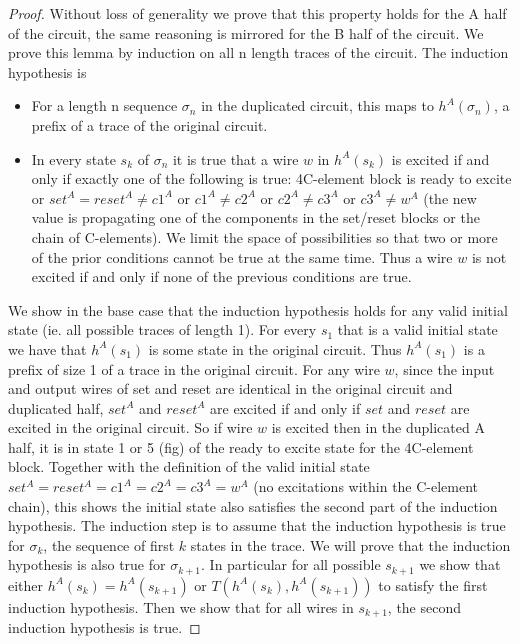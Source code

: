 \documentclass{article}
\begin{document}
\begin{proof}
Without loss of generality we prove that this property holds for the A half of the circuit, the same reasoning is mirrored for the B half of the circuit.  We prove this lemma by induction on all n length traces of the circuit.  The induction hypothesis is
\begin{itemize}
\item For a length n sequence $\sigma_n$ in the duplicated circuit, this maps to $h^{A}(\sigma_n)$, a prefix of a trace of the original circuit. 
\item In every state $s_k$ of $\sigma_n$ it is true that a wire $w$ in $h^A(s_k)$ is excited if and only if exactly one of the following is true: 4C-element block is ready to excite or $set^A=reset^A \neq c1^A$ or $c1^{A}\neq c2^{A}$ or $c2^{A}\neq c3^{A}$ or $c3^{A} \neq w^A$ (the new value is propagating one of the components in the set/reset blocks or the chain of C-elements).  We limit the space of possibilities so that two or more of the prior conditions cannot be true at the same time.  Thus a wire $w$ is not excited if and only if none of the previous conditions are true.
\end{itemize}
We show in the base case that the induction hypothesis holds for any valid initial state (ie. all possible traces of length 1). 
For every $s_1$ that is a valid initial state we have that $h^A(s_1)$ is some state in the original circuit.  Thus $h^A(s_1)$ is a prefix of size 1 of a trace in the original circuit.  For any wire $w$, since the input and output wires of set and reset are identical in the original circuit and duplicated half, $set^A$ and $reset^A$ are excited if and only if $set$ and $reset$ are excited in the original circuit.  So if wire $w$ is excited then in the duplicated A half, it is in state 1 or 5 (fig) of the ready to excite state for the 4C-element block.  Together with the definition of the valid initial state $set^A=reset^A=c1^A=c2^A=c3^A=w^A$ (no excitations within the C-element chain), this shows the initial state also satisfies the second part of the induction hypothesis.   \newline
The induction step is to assume that the induction hypothesis is true for $\sigma_k$, the sequence of first $k$ states in the trace.  We will prove that the induction hypothesis is also true for $\sigma_{k+1}$.  In particular for all possible $s_{k+1}$ we show that either $h^A(s_{k})=h^A(s_{k+1})$ or $T(h^A(s_{k}),h^A(s_{k+1}))$ to satisfy the first induction hypothesis.  Then we show that for all wires in $s_{k+1}$, the second induction hypothesis is true.\newline

\end{proof}
\end{document}
